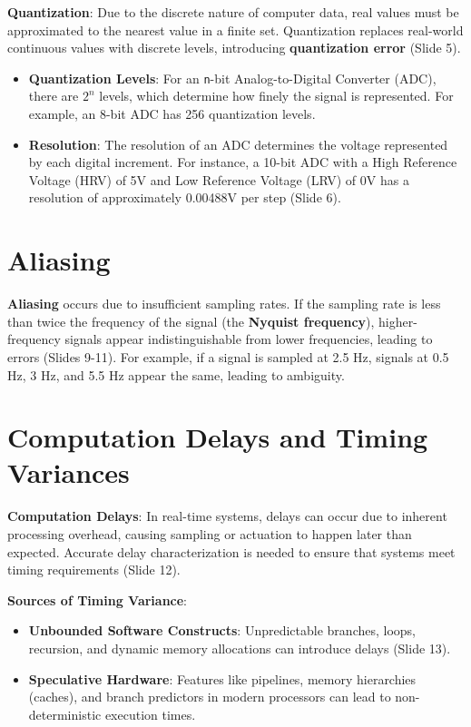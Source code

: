 \documentclass[
  14pt,
  a4paper,
  numbers=noendperiod,
  headinclude=true,
  footinclude=true,
  DIV=calc]{scrreprt}
\begin{document}
\textbf{Quantization}: Due to the discrete nature of computer data, real
values must be approximated to the nearest value in a finite set.
Quantization replaces real-world continuous values with discrete levels,
introducing \textbf{quantization error} (Slide 5).

\begin{itemize}
\item
  \textbf{Quantization Levels}: For an \texttt{n}-bit Analog-to-Digital
  Converter (ADC), there are \(2^n\) levels, which determine how finely
  the signal is represented. For example, an 8-bit ADC has 256
  quantization levels.
\item
  \textbf{Resolution}: The resolution of an ADC determines the voltage
  represented by each digital increment. For instance, a 10-bit ADC with
  a High Reference Voltage (HRV) of 5V and Low Reference Voltage (LRV)
  of 0V has a resolution of approximately 0.00488V per step (Slide 6).
\end{itemize}

\section{Aliasing}\label{aliasing}

\textbf{Aliasing} occurs due to insufficient sampling rates. If the
sampling rate is less than twice the frequency of the signal (the
\textbf{Nyquist frequency}), higher-frequency signals appear
indistinguishable from lower frequencies, leading to errors (Slides
9-11). For example, if a signal is sampled at 2.5 Hz, signals at 0.5 Hz,
3 Hz, and 5.5 Hz appear the same, leading to ambiguity.

\section{Computation Delays and Timing
Variances}\label{computation-delays-and-timing-variances}

\textbf{Computation Delays}: In real-time systems, delays can occur due
to inherent processing overhead, causing sampling or actuation to happen
later than expected. Accurate delay characterization is needed to ensure
that systems meet timing requirements (Slide 12).

\textbf{Sources of Timing Variance}:

\begin{itemize}
\item
  \textbf{Unbounded Software Constructs}: Unpredictable branches, loops,
  recursion, and dynamic memory allocations can introduce delays (Slide
  13).
\item
  \textbf{Speculative Hardware}: Features like pipelines, memory
  hierarchies (caches), and branch predictors in modern processors can
  lead to non-deterministic execution times.
\end{itemize}
\end{document}

